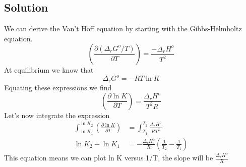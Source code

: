 \documentclass{article}
\newcommand{\be}{\begin{equation}}
\newcommand{\ee}{\end{equation}}
\newcommand{\pd}{\partial}
\begin{document}
\subsection*{Solution}
We can derive the Van't Hoff equation by starting with the Gibbs-Helmholtz equation.
\be
\left(\frac{\pd (\Delta_rG^o/T)}{\pd T}\right) = \frac{-\Delta_rH^o}{T^2}
\ee
At equilibrium we know that 
\be
\Delta_rG^o = -RT\ln K
\ee
Equating these expressions we find
\be
\left(\frac{\pd \ln K}{\pd T}\right) = \frac{\Delta_rH^o}{T^2 R}
\ee
Let's now integrate the expression
\be
\begin{split}
\int_{\ln K_1}^{\ln K_2}\left(\frac{\pd \ln K}{\pd T}\right) &= \int_{T_1}^{T_2}\frac{\Delta_rH^o}{RT^2}\\
\ln K_2 - \ln K_1 &= -\frac{\Delta_r H^o}{R}\left(\frac{1}{T_2}- \frac{1}{T_1} \right)
\end{split}
\ee
This equation means we can plot ln K versus 1/T, the slope will be $\frac{\Delta_rH^o}{R}$
\end{document}
